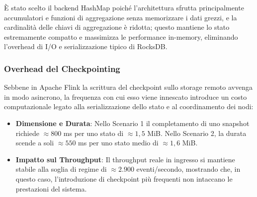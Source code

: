 \documentclass[conference]{IEEEtran}
\begin{document}
È stato scelto il backend HashMap poiché l'architettura sfrutta principalmente accumulatori e funzioni di aggregazione senza memorizzare i dati grezzi, e la cardinalità delle chiavi di aggregazione è ridotta; questo mantiene lo stato estremamente compatto e massimizza le performance in-memory, eliminando l'overhead di I/O e serializzazione tipico di RocksDB.

\subsubsection{Overhead del Checkpointing}\label{subsubsec:checkpoint_overhead}

Sebbene in Apache Flink la scrittura del checkpoint sullo storage remoto avvenga in modo asincrono, la frequenza con cui esso viene innescato introduce un costo computazionale legato alla serializzazione dello stato e al coordinamento dei nodi:
\begin{itemize}
    \item \textbf{Dimensione e Durata}: Nello Scenario 1 il completamento di uno snapshot richiede $\approx 800$ ms per uno stato di $\approx 1,5$ MiB. Nello Scenario 2, la durata scende a soli $\approx 550$ ms per uno stato medio di $\approx 1,6$ MiB.
    \item \textbf{Impatto sul Throughput}: Il throughput reale in ingresso si mantiene stabile alla soglia di regime di $\approx 2.900$ eventi/secondo, mostrando che, in questo caso, l'introduzione di checkpoint più frequenti non intaccano le prestazioni del sistema.
\end{itemize}

\end{document}
